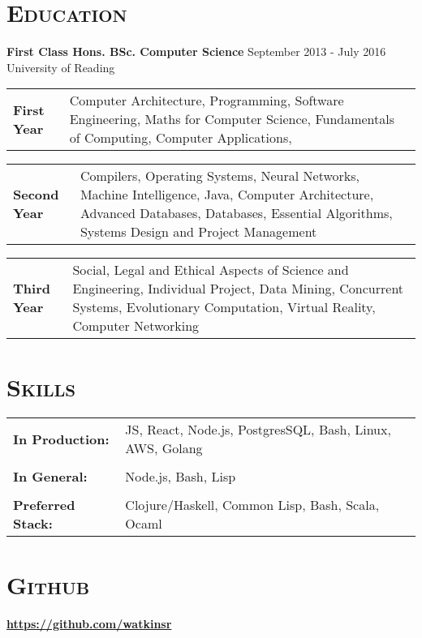 \documentclass[line, margin, 10pt]{res}
\begin{document}
\begin{resume}
\section{\textsc{Education}}
{\bf First Class Hons. BSc. Computer Science}  {\hfill September 2013 - July 2016}\\
University of Reading

\begin{tabular}[t]{@{} p{1.2in} p{4.5in} @{}}
\bf{First Year}  & Computer Architecture,
  Programming, 
  Software Engineering,
  Maths for Computer Science,
  Fundamentals of Computing,
  Computer Applications,
\end{tabular}

\begin{tabular}[t]{@{} p{1.2in} p{4.5in} @{}}  
\bf{Second Year}  & Compilers,
  Operating Systems,
  Neural Networks,
  Machine Intelligence,
  Java,
  Computer Architecture,
  Advanced Databases,
  Databases,
  Essential Algorithms,
  Systems Design and Project Management
\end{tabular}

\begin{tabular}[t]{@{} p{1.2in} p{4.5in} @{}}  
\bf{Third Year}  & Social, Legal and Ethical Aspects of Science and Engineering,
  Individual Project,
  Data Mining,
  Concurrent Systems,  
  Evolutionary Computation,
  Virtual Reality,
  Computer Networking
\end{tabular}

\section{\textsc{Skills}}
   \begin{tabular}[t]{@{} p{1.2in} p{3.75in} @{}}
     \bf{In Production:} & JS, React, Node.js, PostgresSQL, Bash, Linux, AWS, Golang \\
    \\
    \bf{In General:} & Node.js, Bash, Lisp  \\
    \\
    \bf{Preferred Stack:} & Clojure/Haskell, Common Lisp, Bash, Scala, Ocaml \\
 \end{tabular}

\section{\textsc{Github}}
{\bf \url{https://github.com/watkinsr}}\\


\end{resume}
\end{document}
